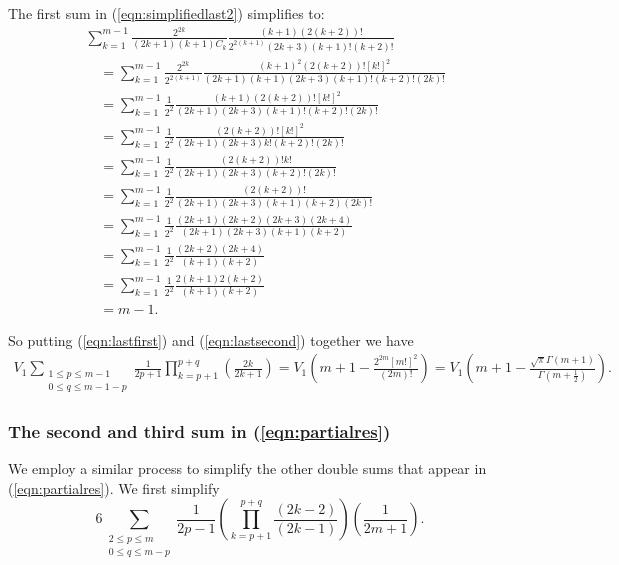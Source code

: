 \documentclass[11pt]{article}
\theoremstyle{definition}
\theoremstyle{definition}
\theoremstyle{plain}
\theoremstyle{plain}
\theoremstyle{plain}
\theoremstyle{definition}
\theoremstyle{definition}
\begin{document}
{The first sum in (\ref{eqn:simplifiedlast2}) simplifies to:
\begin{equation}\label{eqn:lastfirst}
\begin{aligned}
&\sum\limits_{k=1}^{m-1}\frac{2^{2k}}{(2k+1)(k+1)C_k}\frac{(k+1)(2(k+2))!}{2^{2(k+1)}(2k+3)(k+1)!(k+2)!} \\
&\quad= \sum\limits_{k=1}^{m-1}\frac{2^{2k}}{2^{2(k+1)}}\frac{(k+1)^2(2(k+2))![k!]^2}{(2k+1)(k+1)(2k+3)(k+1)!(k+2)!(2k)!} \\
&\quad= \sum\limits_{k=1}^{m-1}\frac{1}{2^2}\frac{(k+1)(2(k+2))![k!]^2}{(2k+1)(2k+3)(k+1)!(k+2)!(2k)!} \\
&\quad= \sum\limits_{k=1}^{m-1}\frac{1}{2^2}\frac{(2(k+2))![k!]^2}{(2k+1)(2k+3)k!(k+2)!(2k)!} \\
&\quad= \sum\limits_{k=1}^{m-1}\frac{1}{2^2}\frac{(2(k+2))!k!}{(2k+1)(2k+3)(k+2)!(2k)!} \\
&\quad = \sum\limits_{k=1}^{m-1}\frac{1}{2^2}\frac{(2(k+2))!}{(2k+1)(2k+3)(k+1)(k+2)(2k)!} \\
&\quad = \sum\limits_{k=1}^{m-1}\frac{1}{2^2}\frac{(2k+1)(2k+2)(2k+3)(2k+4)}{(2k+1)(2k+3)(k+1)(k+2)} \\
&\quad = \sum\limits_{k=1}^{m-1}\frac{1}{2^2}\frac{(2k+2)(2k+4)}{(k+1)(k+2)} \\
&\quad = \sum\limits_{k=1}^{m-1}\frac{1}{2^2}\frac{2(k+1)2(k+2)}{(k+1)(k+2)} \\
&\quad = m-1.
\end{aligned}
\end{equation}

So putting (\ref{eqn:lastfirst}) and (\ref{eqn:lastsecond}) together we have
\begin{equation}\label{eqn:lastsimp}
\begin{aligned}
V_1\sum\limits_{\substack{1\leq p \leq m -1 \\ 0 \leq q \leq m-1-p}}\frac{1}{2p+1}\prod\limits_{k=p+1}^{p+q}\left(\frac{2k}{2k+1}\right) = V_1\left(m+1 - \frac{2^{2m}[m!]^2}{(2m)!}\right) = V_1\left(m+1-\frac{\sqrt{\pi}\Gamma(m+1)}{\Gamma\left(m+\frac{1}{2}\right)}\right).
\end{aligned}
\end{equation}

\subsubsection*{The second and third sum in (\ref{eqn:partialres})}

We employ a similar process to simplify the other double sums that appear in (\ref{eqn:partialres}). We first simplify
\begin{equation}\label{eqn:third}
6\sum\limits_{\substack{2 \leq p \leq m \\ 0 \leq q \leq m - p}} \frac{1}{2p-1}\left(\prod\limits_{k=p+1}^{p+q}\frac{(2k-2)}{(2k-1)}\right)\left(\frac{1}{2m+1}\right).
\end{equation}

}
\end{document}
